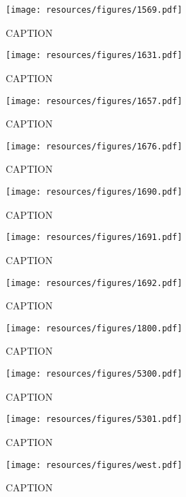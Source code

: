 \begin{figure}[H]
\texttt{[image: resources/figures/1569.pdf]}
\caption{CAPTION}
\label{fig:appendix_1569}
\end{figure}

\begin{figure}[H]
\texttt{[image: resources/figures/1631.pdf]}
\caption{CAPTION}
\label{fig:appendix_1631}
\end{figure}

\begin{figure}[H]
\texttt{[image: resources/figures/1657.pdf]}
\caption{CAPTION}
\label{fig:appendix_1657}
\end{figure}

\begin{figure}[H]
\texttt{[image: resources/figures/1676.pdf]}
\caption{CAPTION}
\label{fig:appendix_1676}
\end{figure}

\begin{figure}[H]
\texttt{[image: resources/figures/1690.pdf]}
\caption{CAPTION}
\label{fig:appendix_1690}
\end{figure}

\begin{figure}[H]
\texttt{[image: resources/figures/1691.pdf]}
\caption{CAPTION}
\label{fig:appendix_1691}
\end{figure}

\begin{figure}[H]
\texttt{[image: resources/figures/1692.pdf]}
\caption{CAPTION}
\label{fig:appendix_1692}
\end{figure}

\begin{figure}[H]
\texttt{[image: resources/figures/1800.pdf]}
\caption{CAPTION}
\label{fig:appendix_1800}
\end{figure}

\begin{figure}[H]
\texttt{[image: resources/figures/5300.pdf]}
\caption{CAPTION}
\label{fig:appendix_5300}
\end{figure}

\begin{figure}[H]
\texttt{[image: resources/figures/5301.pdf]}
\caption{CAPTION}
\label{fig:appendix_5301}
\end{figure}

\begin{figure}[H]
\texttt{[image: resources/figures/west.pdf]}
\caption{CAPTION}
\label{fig:appendix_west}
\end{figure}
